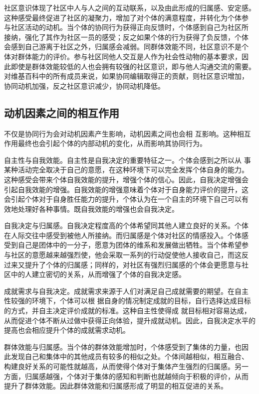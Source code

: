 社区意识体现了社区中人与人之间的互动联系，以及由此形成的归属感、安定感。
这种感受最终促进了社区的凝聚力，增加了对个体的满意程度，并转化为个体参
与社区活动的动机。当个体的协同行为获得正向反馈时，个体感到自己为社区所
接纳，强化了其作为社区一员的感受；反之如果个体的行为获得了负反馈，个体
会感到自己游离于社区之外，归属感会减弱。同群体效能不同，社区意识不是个
体对群体能力的评价。参与社区同他人交互是人作为社会性动物的基本要求，因
此即使是群体效能较低的人也会拥有较强的社区意识，即与他人沟通交流的需要。
对维基百科中的所有成员来说，如果协同编辑取得正的贡献，则社区意识增加，
协同动机加强，反之社区意识减少，协同动机降低。


\subsection{动机因素之间的相互作用}
\label{sec:interaction}
不仅是协同行为会对动机因素产生影响，动机因素之间也会相
互影响。这种相互
作用最终也会引起个体的内部动机的变化，从而影响其协同行为。

自主性与自我效能。自主性是自我决定的重要特征之一。个体会感到之所以从
事某种活动完全取决于自己的意愿，在这种环境下可以完全发挥个体自身的能力。
这种感受会带来个体自我效能的提升，增强个体的信心。因此，自我决定增强会
引起自我效能的增强。自我效能的增强意味着个体对于自身能力评价的提升，这
会引起个体对于自身胜任能力的提升，个体认为在一个自主的环境下自己可以有
效地处理好各种事情。既自我效能的增强也会自我决定。



自我决定与归属感。自我决定程度高的个体希望同其他人建立良好的关系。个体
在人际交往中感受到被他人所接纳。而归属感是个体对社区的情感投入。个体感
受到自己是团体中的一分子，愿意为团体的维系和发展做出牺牲。当个体希望参
与社区的意愿越来越强烈使，他会采取一系列的行动促使他人接收自己，而这反
过来又提升了个体的归属感；同样的，对社区有强烈归属感的个体会更愿意与社
区中的人建立密切的关系，从而增强了个体的自我决定感。

成就需求与自我决定。成就需求来源于人们对满足自己成就需要的期望。在自主
性较强的环境下，个体可以根
据自身的情况制定成就的目标，自行选择达成目标的方式，并自主决定评价成就的标准。这种自主性使得成
就目标相对容易达成，从而促进个体不断从过做中获得正向体验，提升成就动机。因此，自我决定水平的
提高也会相应提升个体的成就需求动机。

群体效能与归属感。当个体的群体效能增加时，个体感受到了集体的力量，也因
此发现自己和集体中的其他成员有较多的相似之处。个体间越相似，相互融合、
构建良好关系的可能性就越高，从而使得个体对于集体产生强烈的归属感。另一
方面，归属感越强，个体对于集体的感知和判断也就越倾向于积极的评价，从而
提升了群体效能。因此群体效能和归属感形成了明显的相互促进的关系。


